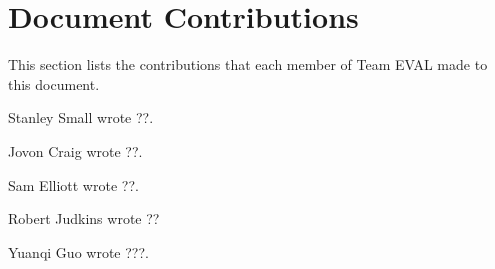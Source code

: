 \documentclass{article}
\begin{document}
\newpage
\section{Document Contributions}

This section lists the contributions that each member of Team EVAL made to this document.

\medskip

Stanley Small wrote ??.

Jovon Craig wrote ??.

Sam Elliott wrote ??.

Robert Judkins wrote ??

Yuanqi Guo wrote ???.

\newpage




\newpage



\end{document}
